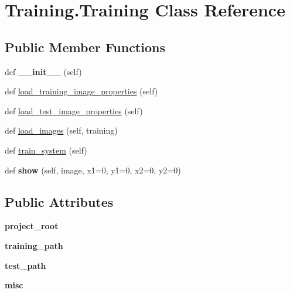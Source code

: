 \hypertarget{class_training_1_1_training}{}\section{Training.\+Training Class Reference}
\label{class_training_1_1_training}
\subsection*{Public Member Functions}
\begin{DoxyCompactItemize}
\item 
\mbox{\label{class_training_1_1_training_aa5c3c606edf57118d04ce14e3bc5704d}} 
def {\bfseries \+\_\+\+\_\+init\+\_\+\+\_\+} (self)
\item 
def \mbox{\hyperlink{class_training_1_1_training_a910d50cee577997808b934c6ef0d5a31}{load\+\_\+training\+\_\+image\+\_\+properties}} (self)
\item 
def \mbox{\hyperlink{class_training_1_1_training_aa886794bd150b7a8894db32437893757}{load\+\_\+test\+\_\+image\+\_\+properties}} (self)
\item 
def \mbox{\hyperlink{class_training_1_1_training_a6df4e220dd5cbd4769a84852fc4e9d60}{load\+\_\+images}} (self, training)
\item 
def \mbox{\hyperlink{class_training_1_1_training_ae08acd1661b3b8d7b7b12a9648abe876}{train\+\_\+system}} (self)
\item 
\mbox{\label{class_training_1_1_training_a8cec544073598dd1b50d5961aaab5045}} 
def {\bfseries show} (self, image, x1=0, y1=0, x2=0, y2=0)
\end{DoxyCompactItemize}
\subsection*{Public Attributes}
\begin{DoxyCompactItemize}
\item 
\mbox{\label{class_training_1_1_training_adc1bd39b2a8a99c55232e472407f09e2}} 
{\bfseries project\+\_\+root}
\item 
\mbox{\label{class_training_1_1_training_a2b03b592f1b0db8a9990845bbeb47962}} 
{\bfseries training\+\_\+path}
\item 
\mbox{\label{class_training_1_1_training_a2b44dd14eec8536c54727936be9325b8}} 
{\bfseries test\+\_\+path}
\item 
\mbox{\label{class_training_1_1_training_ae69d9ae3cd16d5ec81d4386205fcd558}} 
{\bfseries misc}
\end{DoxyCompactItemize}


